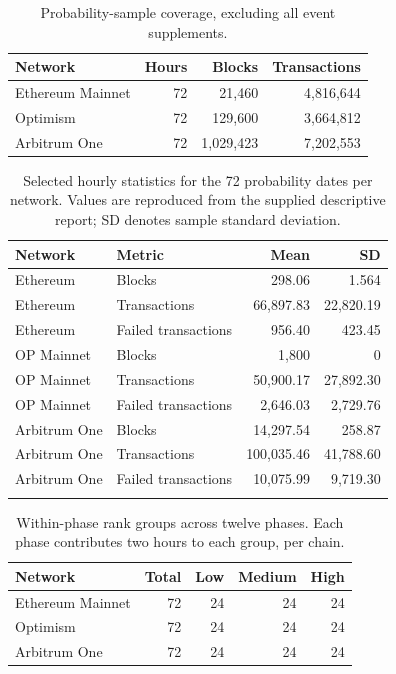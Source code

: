\documentclass[runningheads]{llncs}
\begin{document}
\begin{table}[t]
\caption{Probability-sample coverage, excluding all event supplements.}\label{tab:sample}
\centering\small
\begin{tabular}{@{}lrrr@{}}
\toprule Network & Hours & Blocks & Transactions \\\midrule
Ethereum Mainnet & 72 & 21,460 & 4,816,644 \\
Optimism & 72 & 129,600 & 3,664,812 \\
Arbitrum One & 72 & 1,029,423 & 7,202,553 \\
\bottomrule
\end{tabular}
\end{table}
\begin{table}[t]
\caption{Selected hourly statistics for the 72 probability dates per network. Values are reproduced from the supplied descriptive report; SD denotes sample standard deviation.}\label{tab:hourly}
\centering\small
\begin{tabular}{@{}llrr@{}}
\toprule Network & Metric & Mean & SD \\\midrule
Ethereum & Blocks & 298.06 & 1.564 \\
Ethereum & Transactions & 66,897.83 & 22,820.19 \\
Ethereum & Failed transactions & 956.40 & 423.45 \\
\addlinespace
OP Mainnet & Blocks & 1,800 & 0 \\
OP Mainnet & Transactions & 50,900.17 & 27,892.30 \\
OP Mainnet & Failed transactions & 2,646.03 & 2,729.76 \\
\addlinespace
Arbitrum One & Blocks & 14,297.54 & 258.87 \\
Arbitrum One & Transactions & 100,035.46 & 41,788.60 \\
Arbitrum One & Failed transactions & 10,075.99 & 9,719.30 \\
\addlinespace
\bottomrule
\end{tabular}
\end{table}
\begin{table}[t]
\caption{Within-phase rank groups across twelve phases. Each phase contributes two hours to each group, per chain.}\label{tab:levels}
\centering\small
\begin{tabular}{@{}lrrrr@{}}
\toprule Network & Total & Low & Medium & High \\\midrule
Ethereum Mainnet & 72 & 24 & 24 & 24 \\
Optimism & 72 & 24 & 24 & 24 \\
Arbitrum One & 72 & 24 & 24 & 24 \\
\bottomrule
\end{tabular}
\end{table}
\end{document}

